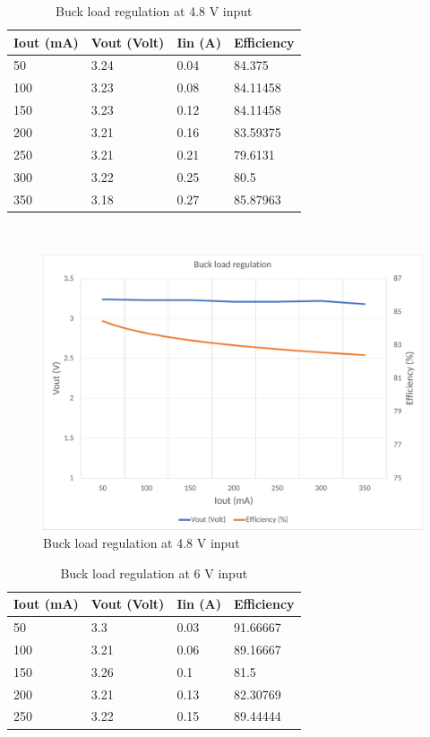 \begin{table}[H]
\centering
\begin{tabular}{|l|l|l|l|}
\hline
Iout (mA) & Vout (Volt) & Iin (A) & Efficiency \\ \hline
50        & 3.24        & 0.04    & 84.375     \\ \hline
100       & 3.23        & 0.08    & 84.11458   \\ \hline
150       & 3.23        & 0.12    & 84.11458   \\ \hline
200       & 3.21        & 0.16    & 83.59375   \\ \hline
250       & 3.21        & 0.21    & 79.6131    \\ \hline
300       & 3.22        & 0.25    & 80.5       \\ \hline
350       & 3.18        & 0.27    & 85.87963   \\ \hline
\end{tabular}
\caption{Buck load regulation at 4.8 V input}
\label{table:4}
\end{table}
\\
\begin{figure}[H]
	\centering
	\includegraphics[width=\columnwidth]{IMGS/Buck load regulation at 4.8V input.pdf}
	\caption{Buck load regulation at 4.8 V input}
	\label{fig:arch}
\end{figure}
\begin{table}[H]
\centering
\begin{tabular}{|l|l|l|l|}
\hline
Iout (mA) & Vout (Volt) & Iin (A) & Efficiency \\ \hline
50        & 3.3         & 0.03    & 91.66667   \\ \hline
100       & 3.21        & 0.06    & 89.16667   \\ \hline
150       & 3.26        & 0.1     & 81.5       \\ \hline
200       & 3.21        & 0.13    & 82.30769   \\ \hline
250       & 3.22        & 0.15    & 89.44444   \\ \hline
\end{tabular}
\caption{Buck load regulation at 6 V input}
\label{table:4}
\end{table}
